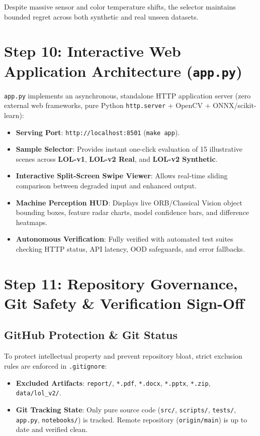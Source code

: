 \documentclass[10pt,a4paper]{article}
\begin{document}
Despite massive sensor and color temperature shifts, the selector maintains bounded regret across both synthetic and real unseen datasets.

\section{Step 10: Interactive Web Application Architecture (\texttt{app.py})}

\texttt{app.py} implements an asynchronous, standalone HTTP application server (zero external web frameworks, pure Python \texttt{http.server} + OpenCV + ONNX/scikit-learn):
\begin{itemize}[leftmargin=*, nosep]
    \item \textbf{Serving Port}: \texttt{http://localhost:8501} (\texttt{make app}).
    \item \textbf{Sample Selector}: Provides instant one-click evaluation of 15 illustrative scenes across \textbf{LOL-v1}, \textbf{LOL-v2 Real}, and \textbf{LOL-v2 Synthetic}.
    \item \textbf{Interactive Split-Screen Swipe Viewer}: Allows real-time sliding comparison between degraded input and enhanced output.
    \item \textbf{Machine Perception HUD}: Displays live ORB/Classical Vision object bounding boxes, feature radar charts, model confidence bars, and difference heatmaps.
    \item \textbf{Autonomous Verification}: Fully verified with automated test suites checking HTTP status, API latency, OOD safeguards, and error fallbacks.
\end{itemize}

\section{Step 11: Repository Governance, Git Safety \& Verification Sign-Off}

\subsection{GitHub Protection \& Git Status}
To protect intellectual property and prevent repository bloat, strict exclusion rules are enforced in \texttt{.gitignore}:
\begin{itemize}[leftmargin=*, nosep]
    \item \textbf{Excluded Artifacts}: \texttt{report/}, \texttt{*.pdf}, \texttt{*.docx}, \texttt{*.pptx}, \texttt{*.zip}, \texttt{data/lol\_v2/}.
    \item \textbf{Git Tracking State}: Only pure source code (\texttt{src/}, \texttt{scripts/}, \texttt{tests/}, \texttt{app.py}, \texttt{notebooks/}) is tracked. Remote repository (\texttt{origin/main}) is up to date and verified clean.
\end{itemize}
\end{document}
